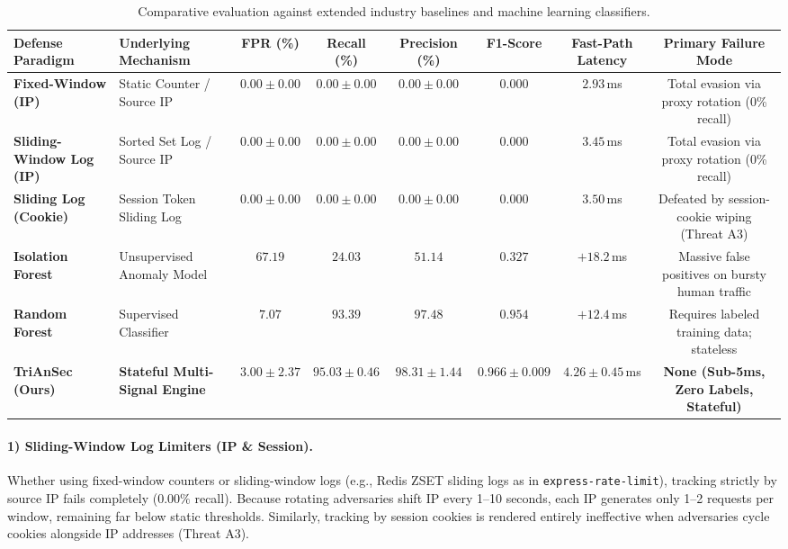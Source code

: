 \documentclass[journal,10pt]{IEEEtran}
\begin{document}
\begin{table}[!t]
\begin{table}[!t]
\centering
\caption{Comparative evaluation against extended industry baselines and machine learning classifiers.}
\label{tab:extended-baselines}
\renewcommand{\arraystretch}{1.18}
\begin{tabularx}{\textwidth}{@{}lXcccccc@{}}
\toprule
\textbf{Defense Paradigm} & \textbf{Underlying Mechanism} & \textbf{FPR (\%)} & \textbf{Recall (\%)} & \textbf{Precision (\%)} & \textbf{F1-Score} & \textbf{Fast-Path Latency} & \textbf{Primary Failure Mode} \\
\midrule
\textbf{Fixed-Window (IP)} & Static Counter / Source IP & $0.00\pm0.00$ & $0.00\pm0.00$ & $0.00\pm0.00$ & $0.000$ & $2.93$\,ms & Total evasion via proxy rotation (0\% recall) \\
\textbf{Sliding-Window Log (IP)} & Sorted Set Log / Source IP & $0.00\pm0.00$ & $0.00\pm0.00$ & $0.00\pm0.00$ & $0.000$ & $3.45$\,ms & Total evasion via proxy rotation (0\% recall) \\
\textbf{Sliding Log (Cookie)} & Session Token Sliding Log & $0.00\pm0.00$ & $0.00\pm0.00$ & $0.00\pm0.00$ & $0.000$ & $3.50$\,ms & Defeated by session-cookie wiping (Threat A3) \\
\textbf{Isolation Forest} & Unsupervised Anomaly Model & $67.19$ & $24.03$ & $51.14$ & $0.327$ & $+18.2$\,ms & Massive false positives on bursty human traffic \\
\textbf{Random Forest} & Supervised Classifier & $7.07$ & $93.39$ & $97.48$ & $0.954$ & $+12.4$\,ms & Requires labeled training data; stateless \\
\midrule
\textbf{TriAnSec (Ours)} & \textbf{Stateful Multi-Signal Engine} & $\mathbf{3.00\pm2.37}$ & $\mathbf{95.03\pm0.46}$ & $\mathbf{98.31\pm1.44}$ & $\mathbf{0.966\pm0.009}$ & $\mathbf{4.26\pm0.45}$\,ms & \textbf{None (Sub-5ms, Zero Labels, Stateful)} \\
\bottomrule
\end{tabularx}
\end{table}

\paragraph{1) Sliding-Window Log Limiters (IP \& Session).} 
Whether using fixed-window counters or sliding-window logs (e.g., Redis ZSET sliding logs as in \texttt{express-rate-limit}), tracking strictly by source IP fails completely ($0.00\%$ recall). Because rotating adversaries shift IP every 1--10 seconds, each IP generates only 1--2 requests per window, remaining far below static thresholds. Similarly, tracking by session cookies is rendered entirely ineffective when adversaries cycle cookies alongside IP addresses (Threat A3).


\end{table}
\end{document}
